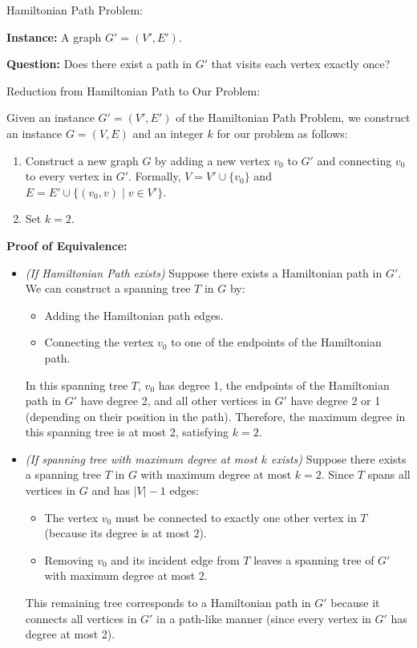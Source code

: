 \documentclass{oxmathproblems}
\begin{document}
\begin{questions}
Hamiltonian Path Problem:

\textbf{Instance:} A graph \( G' = (V', E') \).

\textbf{Question:} Does there exist a path in \( G' \) that visits each vertex exactly once?

Reduction from Hamiltonian Path to Our Problem:

Given an instance \( G' = (V', E') \) of the Hamiltonian Path Problem, we construct an instance \( G = (V, E) \) and an integer \( k \) for our problem as follows:

\begin{enumerate}
    \item Construct a new graph \( G \) by adding a new vertex \( v_0 \) to \( G' \) and connecting \( v_0 \) to every vertex in \( G' \). Formally, \( V = V' \cup \{v_0\} \) and \( E = E' \cup \{(v_0, v) \mid v \in V'\} \).
    \item Set \( k = 2 \).
\end{enumerate}

\textbf{Proof of Equivalence:}

\begin{itemize}
    \item \textit{(If Hamiltonian Path exists)} Suppose there exists a Hamiltonian path in \( G' \). We can construct a spanning tree \( T \) in \( G \) by:
    \begin{itemize}
        \item Adding the Hamiltonian path edges.
        \item Connecting the vertex \( v_0 \) to one of the endpoints of the Hamiltonian path.
    \end{itemize}
    In this spanning tree \( T \), \( v_0 \) has degree 1, the endpoints of the Hamiltonian path in \( G' \) have degree 2, and all other vertices in \( G' \) have degree 2 or 1 (depending on their position in the path). Therefore, the maximum degree in this spanning tree is at most 2, satisfying \( k = 2 \).

    \item \textit{(If spanning tree with maximum degree at most \( k \) exists)} Suppose there exists a spanning tree \( T \) in \( G \) with maximum degree at most \( k = 2 \). Since \( T \) spans all vertices in \( G \) and has \( |V| - 1 \) edges:
    \begin{itemize}
        \item The vertex \( v_0 \) must be connected to exactly one other vertex in \( T \) (because its degree is at most 2).
        \item Removing \( v_0 \) and its incident edge from \( T \) leaves a spanning tree of \( G' \) with maximum degree at most 2.
    \end{itemize}
    This remaining tree corresponds to a Hamiltonian path in \( G' \) because it connects all vertices in \( G' \) in a path-like manner (since every vertex in \( G' \) has degree at most 2).
\end{itemize}


\end{questions}
\end{document}
